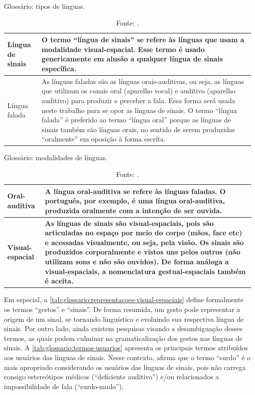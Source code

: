 \begin{table}[htbp]
\caption{Glossário: tipos de línguas.}
\label{tab:glossario:tipos-linguas}
\begin{tabularx}{\textwidth}{l|X} \hline
\textbf{Língua de sinais} & \textbf{O termo ``língua de sinais'' se refere às línguas que usam a modalidade visual-espacial. Esse termo é usado genericamente em alusão a qualquer língua de sinais específica.} \\ \hline
Língua falada & As línguas faladas são as línguas orais-auditivas, ou seja, as línguas que utilizam os canais oral (aparelho vocal) e auditivo (aparelho auditivo) para produzir e perceber a fala. Essa forma será usada neste trabalho para se opor as línguas de sinais. O termo ``língua falada'' é preferido ao termo ``língua oral'' porque as línguas de sinais também são línguas orais, no sentido de serem produzidas ``oralmente'' em oposição à forma escrita. \\ \hline
\end{tabularx}
\caption*{Fonte: .}
\end{table}

\begin{table}[htbp]
\caption{Glossário: modalidades de línguas.}
\label{tab:glossario:modalidades-linguas}
\begin{tabularx}{\textwidth}{l|X} \hline
Oral-auditiva & A língua oral-auditiva se refere às línguas faladas. O português, por exemplo, é uma língua oral-auditiva, produzida oralmente com a intenção de ser ouvida. \\ \hline
\textbf{Visual-espacial} & \textbf{As línguas de sinais são visual-espaciais, pois são articuladas no espaço por meio do corpo (mãos, face etc) e acessadas visualmente, ou seja, pela visão. Os sinais são produzidos corporalmente e vistos uns pelos outros (não utilizam sons e não são ouvidos). De forma análoga a visual-espaciais, a nomenclatura gestual-espaciais também é aceita.} \\ \hline
\end{tabularx}
\caption*{Fonte: .}
\end{table}

Em especial, a \autoref{tab:glossario:representacoes-visual-espaciais} define formalmente os termos ``gestos'' e ``sinais''. De forma resumida, um gesto pode representar a origem de um sinal, se tornando linguístico e evoluindo sua respectiva língua de sinais. Por outro lado, ainda existem pesquisas visando a desambiguação desses termos, as quais podem culminar na gramaticalização dos gestos nas línguas de sinais. A \autoref{tab:glossario:termos-usuarios} apresenta os principais termos atribuídos aos usuários das línguas de sinais. Nesse contexto,  afirma que o termo ``surdo'' é o mais apropriado considerando os usuários das línguas de sinais, pois não carrega consigo estereótipos médicos (``deficiente auditivo'') e/ou relacionados a impossibilidade de fala (``surdo-mudo'').


